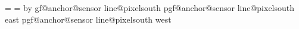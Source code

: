 {{{{          \noexpand\pgf@x=\noexpand\pgf@xb
          \noexpand\pgf@y=\noexpand\pgf@ya
          \noexpand\newdimen\noexpand\temp@y
          \noexpand\pgfmathsetlength\noexpand\temp@y{(\the\c@pgf@counta-\noexpand\pixelNumber)*\noexpand\pixelHeight-\noexpand\innerysep}
          \noexpand\advance\noexpand\pgf@y by\noexpand\temp@y
        }%
        \expandafter\xdef\csname pgf@anchor@sensor line@pixel\space\the\c@pgf@counta\space south%
        \expandafter\xdef\csname pgf@anchor@sensor line@pixel\space\the\c@pgf@counta\space south east%
        \expandafter\xdef\csname pgf@anchor@sensor line@pixel\space\the\c@pgf@counta\space south west}}}
